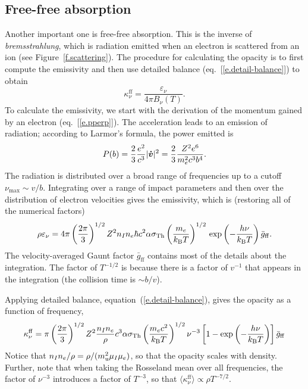 \subsection{Free-free absorption}
Another important one is free-free absorption. This is the inverse of \emph{bremsstrahlung}, which is radiation emitted when an electron is scattered from an ion (see Figure~\ref{f.scattering}). The procedure for calculating the opacity is to first compute the emissivity and then use detailed balance (eq.~[\ref{e.detail-balance}]) to obtain
\[ \kappa_{\nu}^{\mathrm{ff}} = \frac{\varepsilon_{\nu}}{4\pi B_{\nu}(T)} . \] 
To calculate the emissivity, we start with the derivation of the momentum gained by an electron (eq.~[\ref{e.pperp}]).  The acceleration leads to an emission of radiation; according to Larmor's formula, the power emitted is
\begin{equation}\label{e.larmor}
P(b) = \frac{2}{3}\frac{e^{2}}{c^{3}} |\bm{\dot{v}}|^{2} = \frac{2}{3}\frac{Z^{2}e^{6}}{m_{e}^{2}c^{3}b^{4}}.
\end{equation}
The radiation is distributed over a broad range of frequencies up to a cutoff $\nu_{\max}\sim v/b$. Integrating over a range of impact parameters and then over the distribution of electron velocities gives the emissivity, which is (restoring all of the numerical factors)
\begin{equation}\label{e.free-free-w}
\rho \varepsilon_{\nu} = 4\pi\left(\frac{2\pi}{3}\right)^{1/2}Z^{2}n_{I}n_{e} \hbar c^{2}  \alpha \sigma_{\mathrm{Th}} \left(\frac{m_{e}}{k_\mathrm{B} T}\right)^{1/2}\,\exp\left(-\frac{h\nu}{k_\mathrm{B} T}\right) \bar{g}_{\mathrm{ff}}.
\end{equation}
The velocity-averaged Gaunt factor $\bar{g}_{\mathrm{ff}}$ contains most of the details about the integration. The factor of $T^{-1/2}$ is because there is a factor of $v^{-1}$ that appears in the integration (the collision time is $\sim b/v$).  

Applying detailed balance, equation~(\ref{e.detail-balance}), gives the opacity as a function of frequency,
\begin{equation}\label{e.free-free-opacity}
\kappa^{\mathrm{ff}}_{\nu} = \pi\left(\frac{2\pi}{3}\right)^{1/2}Z^{2}\frac{n_{I}n_{e}}{\rho}c^{3}\alpha \sigma_{\mathrm{Th}} \left(\frac{m_{e}c^{2}}{k_\mathrm{B} T}\right)^{1/2} \nu^{-3} \left[ 1- \exp\left(-\frac{h\nu}{k_\mathrm{B} T}\right)  \right] \bar{g}_{\mathrm{ff}}
\end{equation}
Notice that $n_{I}n_{e}/\rho = \rho/(m_\mathrm{u}^{2}\mu_{I}\mu_{e})$, so that the opacity scales with density.  Further, note that when taking the Rosseland mean over all frequencies, the factor of $\nu^{-3}$ introduces a factor of $T^{-3}$, so that $\langle\kappa^{\mathrm{ff}}_{\nu}\rangle \propto \rho T^{-7/2}$.

